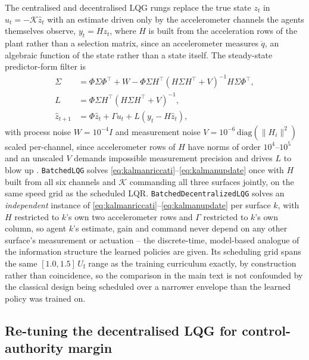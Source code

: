\documentclass[11pt]{article}
\newcommand{\Uf}{U_{\mathrm{f}}}
\begin{document}
The centralised and decentralised LQG rungs replace the true state $z_t$ in
$u_t=-\mathcal{K}\hat z_t$ with an estimate driven only by the accelerometer
channels the agents themselves observe, $y_t = H z_t$, where $H$ is built from
the acceleration rows of the plant rather than a selection matrix, since an
accelerometer measures $\ddot q$, an algebraic function of the state rather
than a state itself. The steady-state predictor-form filter is
\begin{align}
\Sigma &= \Phi\Sigma\Phi^{\!\top} + W
- \Phi\Sigma H^{\!\top}\!\left(H\Sigma H^{\!\top}+V\right)^{-1}\! H\Sigma\Phi^{\!\top},
\label{eq:kalmanriccati} \\
L &= \Phi\Sigma H^{\!\top}\!\left(H\Sigma H^{\!\top}+V\right)^{-1}, \\
\hat z_{t+1} &= \Phi\hat z_t + \Gamma u_t + L\left(y_t - H\hat z_t\right),
\label{eq:kalmanupdate}
\end{align}
with process noise $W=10^{-4}I$ and measurement noise
$V=10^{-6}\,\mathrm{diag}(\lVert H_i\rVert^2)$ scaled per-channel, since
accelerometer rows of $H$ have norms of order $10^4$--$10^5$ and an unscaled
$V$ demands impossible measurement precision and drives $L$ to blow up
\citep{anderson2007optimal}. \texttt{BatchedLQG} solves
\eqref{eq:kalmanriccati}--\eqref{eq:kalmanupdate} once with $H$ built from all
six channels and $\mathcal{K}$ commanding all three surfaces jointly, on the
same speed grid as the scheduled LQR. \texttt{Batched\-Decentralized\-LQG}
solves an \emph{independent} instance of
\eqref{eq:kalmanriccati}--\eqref{eq:kalmanupdate} per surface $k$, with $H$
restricted to $k$'s own two accelerometer rows and $\Gamma$ restricted to $k$'s
own column, so agent $k$'s estimate, gain and command never depend on any
other surface's measurement or actuation -- the discrete-time, model-based
analogue of the information structure the learned policies are given. Its
scheduling grid spans the same $[1.0,1.5]\,\Uf$ range as the training
curriculum exactly, by construction rather than coincidence, so the
comparison in the main text is not confounded by the classical design being
scheduled over a narrower envelope than the learned policy was trained on.

\subsection*{Re-tuning the decentralised LQG for control-authority margin}
\end{document}
